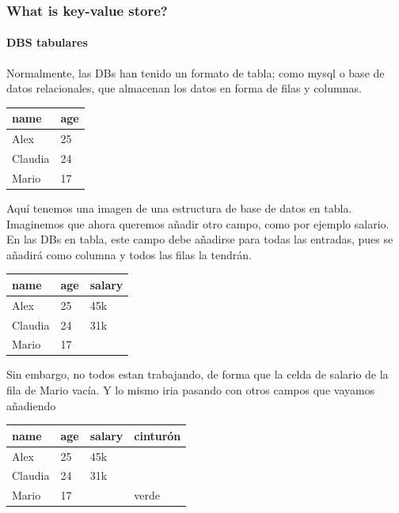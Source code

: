 \documentclass{article}
\begin{document}
\subsubsection{What is  key-value store?}

\paragraph{DBS tabulares}

Normalmente, las DBs han tenido un formato  de tabla; como mysql o base de datos relacionales, que almacenan los datos en forma de filas y columnas.

\begin{table}[H]
\begin{tabular}{|m{5em} | m{1cm}|}
\hline
\textbf{name} & \textbf{age} \\ \hline
Alex  & 25 \\
\hline
Claudia & 24 \\
\hline
Mario & 17 \\
\hline
\end{tabular}
\end{table}

Aquí tenemos una imagen de una estructura de base de datos en tabla. Imaginemos que ahora queremos añadir otro campo, como por ejemplo salario. En las DBs en tabla, este campo debe añadirse para todas las entradas, pues se añadirá como columna y todos las filas la tendrán.

\begin{table}[H]
\begin{tabular}{| m{5em} | m{1cm}| m{1.5cm} |}
\hline
\textbf{name} & \textbf{age} & \textbf{salary} \\ \hline
Alex  & 25 & 45k \\
\hline
Claudia & 24 & 31k \\
\hline
Mario & 17 &  \\
\hline
\end{tabular}
\end{table}

Sin embargo, no todos estan trabajando, de forma que la celda de salario de la fila de Mario vacía. Y lo mismo iria pasando con otros campos que vayamos añadiendo

\begin{table}[H]
\begin{tabular}{| m{5em} | m{1cm}| m{1.5cm} | m{1.7cm} |}
\hline
\textbf{name} & \textbf{age} & \textbf{salary} & \textbf{cinturón} \\ \hline
Alex  & 25 & 45k &  \\
\hline
Claudia & 24 & 31k &  \\
\hline
Mario & 17 & & verde  \\
\hline
\end{tabular}
\end{table}
\end{document}
